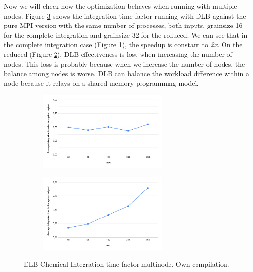 Now we will check how the optimization behaves when running with multiple nodes. Figure \ref{fig:plot-hybrid-dlb-int-mul} shows the integration time factor running with DLB against the pure MPI version with the same number of processes, both inputs, grainsize 16 for the complete integration and grainsize 32 for the reduced. We can see that in the complete integration case (Figure \ref{fig:plot-hybrid-dlb-int-mul-det}), the speedup is constant to \textit{2x}. On the reduced (Figure \ref{fig:plot-hybrid-dlb-int-mul-red}), DLB effectiveness is lost when increasing the number of nodes. This loss is probably because when we increase the number of nodes, the balance among nodes is worse. DLB can balance the workload difference within a node because it relays on a shared memory programming model. %

\begin{figure}[ht]
  \begin{subfigure}{1\textwidth}
    \centering
    \includegraphics[width=0.7\textwidth]{graphics/hybridcompletedlbmulti.png}
    \label{fig:plot-hybrid-dlb-int-mul-det}

  \end{subfigure}
\begin{subfigure}{1\textwidth}
    \centering
    \includegraphics[width=0.7\textwidth]{graphics/hybridreduceddlbmulti.png}
    \label{fig:plot-hybrid-dlb-int-mul-red}

  \end{subfigure}

  \caption[DLB Chemical Integration time factor multinode.]{DLB Chemical Integration time factor multinode. Own compilation.}
  \label{fig:plot-hybrid-dlb-int-mul}
\end{figure}

